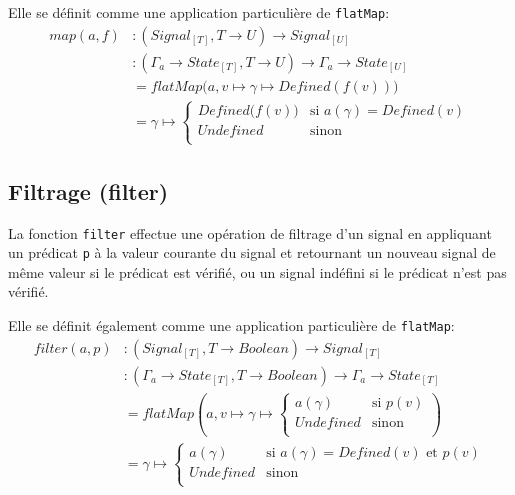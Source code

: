 		\begin{center}
		\end{center}
		
		Elle se définit comme une application particulière de \texttt{flatMap}:
		\begin{align*}
			map(a, f)
				&\colon (Signal_{[T]}, T \to U) \to Signal_{[U]} \\
				&\colon (\Gamma_a \to State_{[T]}, T \to U) \to \Gamma_a \to State_{[U]} \\
				&= flatMap \big( a, v \mapsto \gamma \mapsto Defined(f(v)) \big)\\
				&= \gamma \mapsto \begin{cases}
					Defined \big(f (v) \big) & \text{si } a(\gamma) = Defined(v)\\
					Undefined & \text{sinon}\\
				\end{cases}
		\end{align*}
	
	\subsection{Filtrage (filter)}
	
		La fonction \texttt{filter} effectue une opération de filtrage d'un signal en appliquant un prédicat \texttt{p} à la valeur courante du signal et retournant un nouveau signal de même valeur si le prédicat est vérifié, ou un signal indéfini si le prédicat n'est pas vérifié.
	
		\begin{center}
		\end{center}
		
		Elle se définit également comme une application particulière de \texttt{flatMap}:
		\begin{align*}
			filter(a, p)
				&\colon (Signal_{[T]}, T \to Boolean) \to Signal_{[T]} \\
				&\colon (\Gamma_a \to State_{[T]}, T \to Boolean) \to \Gamma_a \to State_{[T]} \\
				&= flatMap \left( a, v \mapsto \gamma \mapsto \begin{cases}
					a(\gamma) & \text{si } p(v)\\
					Undefined & \text{sinon}\\
				\end{cases} \right)\\
				&= \gamma \mapsto \begin{cases}
					a(\gamma) & \text{si } a(\gamma) = Defined(v) \text{ et } p(v)\\
					Undefined & \text{sinon}\\
				\end{cases}
		\end{align*}
		

